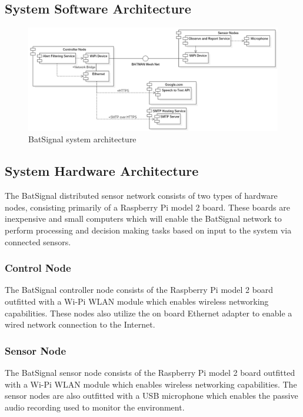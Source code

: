 \documentclass[11pt,a4paper]{article}
\begin{document}
\subsection{System Software Architecture}
\begin{figure}[H]
	\centering
		\includegraphics[width=\textwidth, keepaspectratio=true]{Graphics/SystemArchitecture.png}
	\caption{BatSignal system architecture}
\end{figure}

\subsection{System Hardware Architecture}
The BatSignal distributed sensor network consists of two types of hardware nodes, consisting primarily of a Raspberry Pi model 2 board. These boards are inexpensive and small computers which will enable the BatSignal network to perform processing and decision making tasks based on input to the system via connected sensors. 

\subsubsection{Control Node}
The BatSignal controller node consists of the Raspberry Pi model 2 board outfitted with a Wi-Pi WLAN module which enables wireless networking capabilities. These nodes also utilize the on board Ethernet adapter to enable a wired network connection to the Internet.

\subsubsection{Sensor Node}
The BatSignal sensor node consists of the Raspberry Pi model 2 board outfitted with a Wi-Pi WLAN module which enables wireless networking capabilities. The sensor nodes are also outfitted with a USB microphone which enables the passive audio recording used to monitor the environment.
\end{document}
